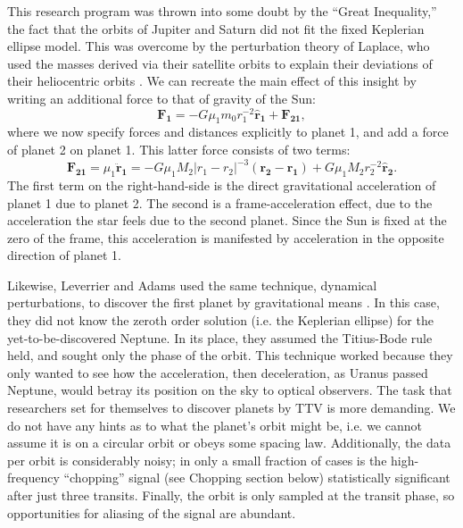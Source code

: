 \documentclass[graybox,natbib,nosecnum]{svmult}
\begin{document}
This research program was thrown into some doubt by the ``Great Inequality,'' the fact that the orbits of Jupiter and Saturn did not fit the fixed Keplerian ellipse model.  This was overcome by the perturbation theory of Laplace, who used the masses derived via their satellite orbits to explain their deviations of their heliocentric orbits \citep{1985Wilson}.  We can recreate the main effect of this insight by writing an additional force to that of gravity of the Sun: 
\begin{equation}
\mathbf{F_{1}} = -G \mu_1 m_0 r_{1}^{-2} \mathbf{\hat r_{1}} + \mathbf{F_{21}},
\end{equation}
where we now specify forces and distances explicitly to planet 1, and add a force of planet 2 on planet 1.  This latter force consists of two terms: 
\begin{equation}
\mathbf{F_{21}} = \mu_1 \mathbf{\ddot r_1} = -G \mu_1 M_2 \vert r_{1}-r_{2}\vert^{-3} (\mathbf{r_{2}} - \mathbf{r_{1}}) + G \mu_1 M_2 r_{2}^{-2} \mathbf{\hat r_{2}}.
\end{equation}
The first term on the right-hand-side is the direct gravitational acceleration of planet 1 due to planet 2.  The second is a frame-acceleration effect, due to the acceleration the star feels due to the second planet.  Since the Sun is fixed at the zero of the frame, this acceleration is manifested by acceleration in the opposite direction of planet 1.  

Likewise, Leverrier and Adams used the same technique, dynamical perturbations, to discover the first planet by gravitational means \citep{Adams1847,LeVerrier1877}. In this case, they did not know the zeroth order solution (i.e. the Keplerian ellipse) for the yet-to-be-discovered Neptune.  In its place, they assumed the Titius-Bode rule held, and sought only the phase of the orbit.  This technique worked because they only wanted to see how the acceleration, then deceleration, as Uranus passed Neptune, would betray its position on the sky to optical observers. The task that researchers set for themselves to discover planets by TTV is more demanding.  We do not have any hints as to what the planet's orbit might be, i.e. we cannot assume it is on a circular orbit or obeys some spacing law.  Additionally, the data per orbit is considerably noisy; in only a small fraction of cases is the high-frequency ``chopping'' signal (see Chopping section below) statistically significant after just three transits. Finally, the orbit is only sampled at the transit phase, so opportunities for aliasing of the signal are abundant.
\end{document}

